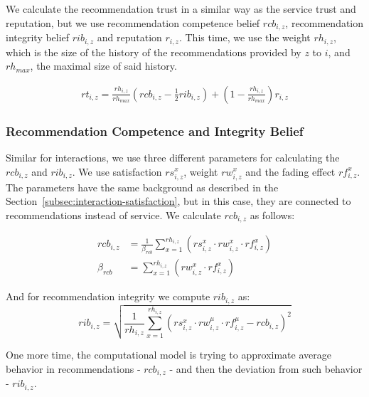 We calculate the recommendation trust in a similar way as the service trust and reputation, but we use recommendation competence belief $rcb_{i, z}$, recommendation integrity belief $rib_{i,z}$ and reputation $r_{i, z}$.
This time, we use the weight $rh_{i,z}$, which is the size of the history of the recommendations provided by $z$ to $i$, and $rh_{max}$, the maximal size of said history.

\begin{equation}
\label{eq:recommendation-trust}
\begin{split}
    rt_{i, z} = \frac{rh_{i,z}}{rh_{max}} \left(rcb_{i,z} - \frac{1}{2} rib_{i, z} \right) + \left(1 - \frac{rh_{i,z}}{rh_{max}} \right) r_{i,z}
\end{split}
\end{equation}

\subsubsection{Recommendation Competence and Integrity Belief}
\label{subsubsec:recommendation-competence-integrity-belief}
Similar for interactions, we use three different parameters for calculating the $rcb_{i, z}$ and $rib_{i,z}$. 
We use satisfaction $rs^{x}_{i, z}$, weight $rw^{x}_{i, z}$ and the fading effect $rf^{x}_{i, z}$. 
The parameters have the same background as described in the Section~\ref{subsec:interaction-satisfaction}, but in this case, they are connected to recommendations instead of service.
We calculate $rcb_{i, z}$ as follows:

\begin{equation}
\begin{split}
    rcb_{i, z} &= \frac{1}{\beta_{rcb}} \sum_{x = 1}^{rh_{i, z}}\left(rs_{i,z}^{x} \cdot rw_{i, z}^{x} \cdot rf_{i,z}^{x}\right) \\
    \beta_{rcb} &= \sum_{x = 1}^{rh_{i, z}}\left(rw_{i, z}^{x} \cdot rf_{i,z}^{x}\right)
\end{split}
\end{equation}

\noindent
And for recommendation integrity we compute $rib_{i, z}$ as:
\begin{equation}
    rib_{i, z} = \sqrt{\frac{1}{rh_{i, z}} \sum_{x=1}^{rh_{i,z}} \left(rs_{i,z}^{x} \cdot rw_{i, z}^{\mu} \cdot rf_{i,z}^{\mu} - rcb_{i,z}\right)^{2}}
\end{equation}

\noindent
One more time, the computational model is trying to approximate average behavior in recommendations - $rcb_{i,z}$ - and then the deviation from such behavior - $rib_{i,z}$.

